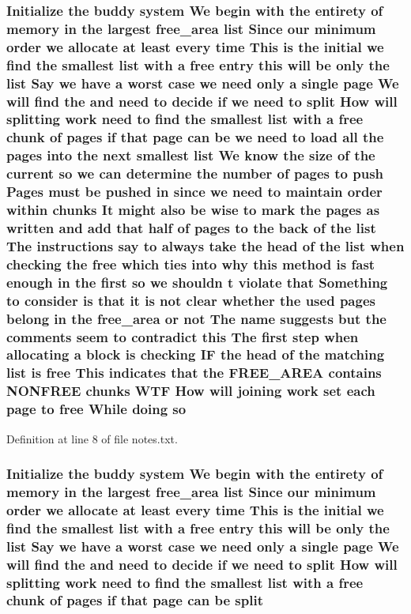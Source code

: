 \subsubsection[{\texorpdfstring{so}{so}}]{\setlength{\rightskip}{0pt plus 5cm}Initialize the buddy system We begin with the entirety of memory {\bf in} the largest {\bf free\+\_\+area} {\bf list} Since our minimum {\bf order} we allocate at least every time This {\bf is} the initial we find the smallest {\bf list} with a free entry this will be only the {\bf list} Say we have a worst case we need only a single {\bf page} We will find the and need to decide if we need to {\bf split} How will splitting work need to find the smallest {\bf list} with a free {\bf chunk} of {\bf pages} if that {\bf page} can be we need to load all the {\bf pages} into the next smallest {\bf list} We know the size of the current so we can determine the number of {\bf pages} to push Pages must be pushed {\bf in} since we need to maintain {\bf order} within chunks It might also be wise to mark the {\bf pages} as written and add that half of {\bf pages} to the back of the {\bf list} The instructions say to always take the head of the {\bf list} when checking the free which ties into why this method {\bf is} fast enough {\bf in} the {\bf first} so we shouldn t violate that Something to consider {\bf is} that {\bf it} {\bf is} {\bf not} clear whether the used {\bf pages} belong {\bf in} the {\bf free\+\_\+area} or {\bf not} The name suggests but the comments seem to contradict this The {\bf first} step when allocating a block {\bf is} checking IF the head of the matching {\bf list} {\bf is} free This indicates that the F\+R\+E\+E\+\_\+\+A\+R\+EA contains N\+O\+N\+F\+R\+EE chunks W\+TF How will joining work set each {\bf page} to free While doing so}\hypertarget{notes_8txt_a94bb352e5752d8ad57a98d778a6ac2e5}{}\label{notes_8txt_a94bb352e5752d8ad57a98d778a6ac2e5}


Definition at line 8 of file notes.\+txt.

\subsubsection[{\texorpdfstring{split}{split}}]{\setlength{\rightskip}{0pt plus 5cm}Initialize the buddy system We begin with the entirety of memory {\bf in} the largest {\bf free\+\_\+area} {\bf list} Since our minimum {\bf order} we allocate at least every time This {\bf is} the initial we find the smallest {\bf list} with a free entry this will be only the {\bf list} Say we have a worst case we need only a single {\bf page} We will find the and need to decide if we need to split How will splitting work need to find the smallest {\bf list} with a free {\bf chunk} of {\bf pages} if that {\bf page} can be split}\hypertarget{notes_8txt_a4b5d94b2e51a5d61abee5e3d1156f235}{}\label{notes_8txt_a4b5d94b2e51a5d61abee5e3d1156f235}


